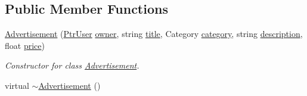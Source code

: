 \subsection*{Public Member Functions}
\begin{DoxyCompactItemize}
\item 
\hyperlink{class_advertisement_ad424d4af8c03981a8eb03512dd67ae0d}{Advertisement} (\hyperlink{class_ptr_user}{Ptr\+User} \hyperlink{class_advertisement_abcb6446847bfd1880be9c854c4442313}{owner}, string \hyperlink{class_advertisement_a63b197da6f91139ed6baf700f834a3db}{title}, Category \hyperlink{class_advertisement_af77599e289974c0e4f502db621257fe5}{category}, string \hyperlink{class_advertisement_afb0909f9fceabb44804e06e721ff7fee}{description}, float \hyperlink{class_advertisement_aefd1dddaabd0cfa411e6cbaaf67c4dd5}{price})
\begin{DoxyCompactList}\small\item\em Constructor for class \hyperlink{class_advertisement}{Advertisement}. \end{DoxyCompactList}\item 
\hypertarget{class_advertisement_a49170a22dcd2a8bf88d3ed1aad475b82}{}virtual \hyperlink{class_advertisement_a49170a22dcd2a8bf88d3ed1aad475b82}{$\sim$\+Advertisement} ()\label{class_advertisement_a49170a22dcd2a8bf88d3ed1aad475b82}


\end{DoxyCompactItemize}
